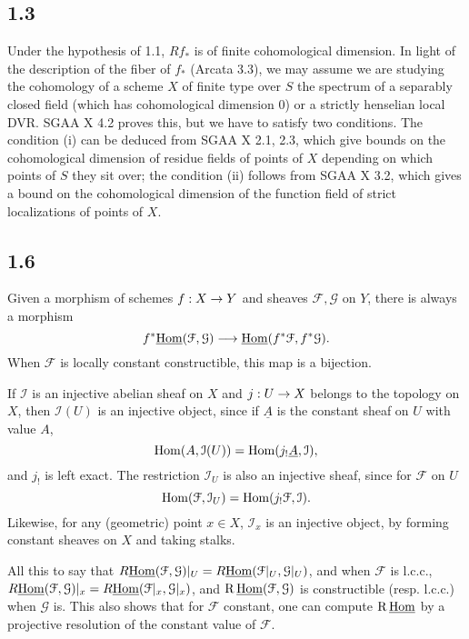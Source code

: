 \documentclass[deligne.tex]{subfiles}
\begin{document}
	\subsection*{1.3}\label{thfin:1.3} Under the hypothesis of 1.1, $Rf_*$ is of finite
	cohomological dimension. In light of the description of the fiber of
	$f_*$ (Arcata 3.3), we may assume we are studying the cohomology of a
	scheme $X$ of finite type over $S$ the spectrum of a separably closed 
	field (which has cohomological dimension 0)
	or a strictly henselian local DVR.
	SGAA X 4.2 proves this, but we have to satisfy two conditions.
	The condition (i) can be deduced from SGAA X 2.1, 2.3, which give
	bounds on the cohomological dimension of residue
	fields of points of $X$ depending on which points of $S$ they sit over;
	the condition (ii) follows from SGAA X 3.2, which gives a bound on the
	cohomological dimension of the function field of strict localizations
	of points of $X$.
	
	\subsection*{1.6}
	Given a morphism of schemes $f:X\rightarrow Y$ and sheaves $\mathcal F,\mathcal G$
	on $Y$, there is always a morphism
	\begin{equation*}
		f^*\underline{\operatorname{Hom}}(\mathcal F,\mathcal G)\longrightarrow
		\underline{\operatorname{Hom}}(f^*\mathcal F,f^*\mathcal G).
	\end{equation*}
	When $\mathcal F$ is locally constant constructible, this map is a 
	bijection.
	
	If $\mathcal I$ is an injective abelian sheaf on $X$ and $j:U\rightarrow X$ 
	belongs to the topology on $X$, then $\mathcal I(U)$ is an injective 
	object, since if $\underline A$ is the constant sheaf on $U$ with value 
	$A$,
	\begin{equation*}
		\operatorname{Hom}(A,\mathcal I(U))=\operatorname{Hom}(j_!\underline A,\mathcal I),
	\end{equation*}
	and $j_!$ is left exact.
	The restriction $\mathcal I_U$ is also an injective sheaf, since for
	$\mathcal F$ on $U$
	\begin{equation*}
		\operatorname{Hom}(\mathcal F,\mathcal I_U)=\operatorname{Hom}(j_!\mathcal F,\mathcal I).
	\end{equation*}
	Likewise, for any (geometric) point $x\in X$, $\mathcal I_x$ is an
	injective object, by forming constant sheaves on $X$ and taking stalks.
	
	All this to say that $R\underline{\operatorname{Hom}}(\mathcal F,\mathcal G)|_U=
	R\underline{\operatorname{Hom}}(\mathcal F|_U,\mathcal G|_U)$, and when $\mathcal F$
	is l.c.c.,
	$R\underline{\operatorname{Hom}}(\mathcal F,\mathcal G)|_x=
	R\underline{\operatorname{Hom}}(\mathcal F|_x,\mathcal G|_x)$, and
	$\operatorname{R}\underline{\operatorname{Hom}}(\mathcal F,\mathcal G)$ is constructible (resp. l.c.c.)
	when $\mathcal G$ is. This also shows that for $\mathcal F$ constant,
	one can compute $\operatorname{R}\underline{\operatorname{Hom}}$ by a projective resolution of the
	constant value of $\mathcal F$.
	
\end{document}
